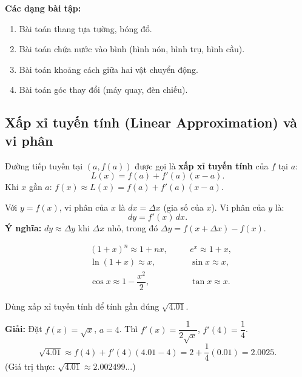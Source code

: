\documentclass[12pt,a4paper]{article}
\begin{document}
\medskip\noindent\textbf{Các dạng bài tập:}
\begin{enumerate}[label=\textbf{Dạng \arabic*:}, leftmargin=*, align=left]
  \item Bài toán thang tựa tường, bóng đổ.
  \item Bài toán chứa nước vào bình (hình nón, hình trụ, hình cầu).
  \item Bài toán khoảng cách giữa hai vật chuyển động.
  \item Bài toán góc thay đổi (máy quay, đèn chiếu).
\end{enumerate}

\subsection{Xấp xỉ tuyến tính (Linear Approximation) và vi phân}

\begin{dinhnghia}[title={Xấp xỉ tuyến tính}]
  Đường tiếp tuyến tại $(a, f(a))$ được gọi là \textbf{xấp xỉ tuyến tính} của $f$ tại $a$:
  \[
    L(x) = f(a) + f'(a)(x - a).
  \]
  Khi $x$ gần $a$: $f(x) \approx L(x) = f(a) + f'(a)(x - a)$.
\end{dinhnghia}

\begin{dinhnghia}[title={Vi phân (Differentials)}]
  Với $y = f(x)$, vi phân của $x$ là $dx = \Delta x$ (gia số của $x$). Vi phân của $y$ là:
  \[
    dy = f'(x)\,dx.
  \]
  \textbf{Ý nghĩa:} $dy \approx \Delta y$ khi $\Delta x$ nhỏ, trong đó $\Delta y = f(x + \Delta x) - f(x)$.
\end{dinhnghia}

\begin{congthuc}[title={Một số xấp xỉ thường dùng (khi $x \approx 0$)}]
  \begin{align*}
    &(1+x)^n \approx 1 + nx, &\quad& e^x \approx 1 + x, \\
    &\ln(1+x) \approx x, &\quad& \sin x \approx x, \\
    &\cos x \approx 1 - \dfrac{x^2}{2}, &\quad& \tan x \approx x.
  \end{align*}
\end{congthuc}

\begin{vidu}
  Dùng xấp xỉ tuyến tính để tính gần đúng $\sqrt{4.01}$.

  \medskip\textbf{Giải:}
  Đặt $f(x) = \sqrt{x}$, $a = 4$. Thì $f'(x) = \dfrac{1}{2\sqrt{x}}$, $f'(4) = \dfrac{1}{4}$.
  \[
    \sqrt{4.01} \approx f(4) + f'(4)(4.01 - 4) = 2 + \frac{1}{4}(0.01) = 2.0025.
  \]
  (Giá trị thực: $\sqrt{4.01} \approx 2.002499...$)
\end{vidu}
\end{document}
